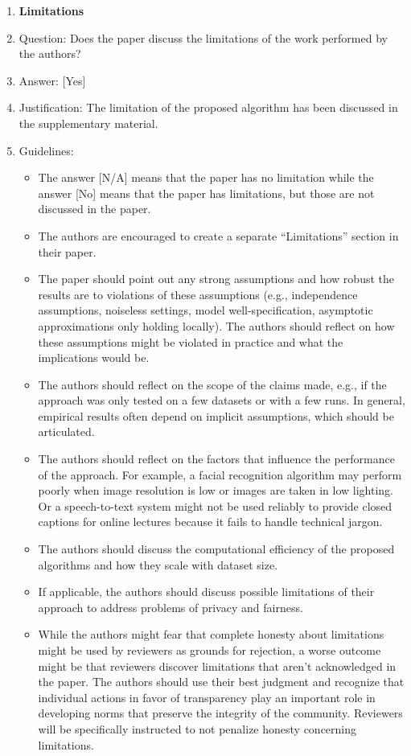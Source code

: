 \documentclass{llmxive}
\providecommand{\answerYes}[1][]{[Yes]#1}
\providecommand{\answerNo}[1][]{[No]#1}
\providecommand{\answerNA}[1][]{[N/A]#1}
\begin{document}
{\begin{enumerate}
\item {\bf Limitations}
    \item[] Question: Does the paper discuss the limitations of the work performed by the authors?
    \item[] Answer: \answerYes{} %
    \item[] Justification: The limitation of the proposed algorithm has been discussed in the supplementary material.
    \item[] Guidelines:
    \begin{itemize}
        \item The answer \answerNA{} means that the paper has no limitation while the answer \answerNo{} means that the paper has limitations, but those are not discussed in the paper. 
        \item The authors are encouraged to create a separate ``Limitations'' section in their paper.
        \item The paper should point out any strong assumptions and how robust the results are to violations of these assumptions (e.g., independence assumptions, noiseless settings, model well-specification, asymptotic approximations only holding locally). The authors should reflect on how these assumptions might be violated in practice and what the implications would be.
        \item The authors should reflect on the scope of the claims made, e.g., if the approach was only tested on a few datasets or with a few runs. In general, empirical results often depend on implicit assumptions, which should be articulated.
        \item The authors should reflect on the factors that influence the performance of the approach. For example, a facial recognition algorithm may perform poorly when image resolution is low or images are taken in low lighting. Or a speech-to-text system might not be used reliably to provide closed captions for online lectures because it fails to handle technical jargon.
        \item The authors should discuss the computational efficiency of the proposed algorithms and how they scale with dataset size.
        \item If applicable, the authors should discuss possible limitations of their approach to address problems of privacy and fairness.
        \item While the authors might fear that complete honesty about limitations might be used by reviewers as grounds for rejection, a worse outcome might be that reviewers discover limitations that aren't acknowledged in the paper. The authors should use their best judgment and recognize that individual actions in favor of transparency play an important role in developing norms that preserve the integrity of the community. Reviewers will be specifically instructed to not penalize honesty concerning limitations.
    \end{itemize}


\end{enumerate}}
\end{document}
